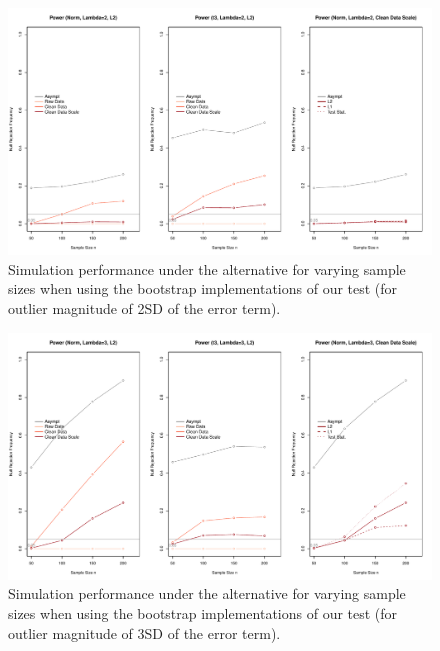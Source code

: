 \documentclass[11pt, letterpaper]{article}
\numberwithin{algorithm}{section}
\numberwithin{assumption}{section}
\numberwithin{lemma}{section}
\numberwithin{theorem}{section}
\numberwithin{corollary}{section}
\numberwithin{remark}{section}
\numberwithin{equation}{section}
\numberwithin{figure}{section}
\numberwithin{table}{section}
\begin{document}
\begin{figure}[!htbp]  %
\centering
\includegraphics[width = \textwidth]{boot_alt_lambda2.pdf}
\caption{Simulation performance under the alternative for varying sample sizes when using the bootstrap implementations of our test (for outlier magnitude of 2SD of the error term).}
\label{fig_out_sim_alt_boot2}
\end{figure}

\begin{figure}[!htbp]  %
\centering
\includegraphics[width = \textwidth]{boot_alt_lambda3.pdf}
\caption{Simulation performance under the alternative for varying sample sizes when using the bootstrap implementations of our test (for outlier magnitude of 3SD of the error term).}
\label{fig_out_sim_alt_boot3}
\end{figure}

\end{document}
